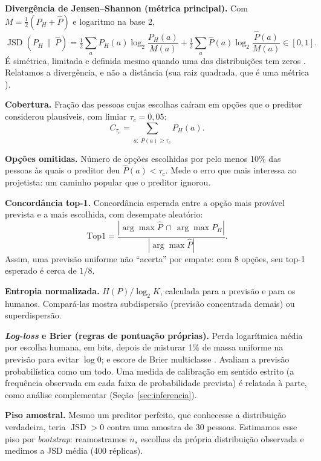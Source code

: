 \documentclass[12pt,oneside,a4paper,chapter=TITLE,english,brazil]{abntex2}
\newcommand{\Ph}{P_H}
\newcommand{\Pp}{\hat{P}}
\DeclareMathOperator{\JSD}{JSD}
\begin{document}
\textbf{Divergência de Jensen--Shannon (métrica principal).} Com $M=\tfrac12(\Ph+\Pp)$ e logaritmo na base 2,
\begin{equation}
\JSD(\Ph \,\|\, \Pp) = \tfrac12 \sum_a \Ph(a)\log_2\frac{\Ph(a)}{M(a)} + \tfrac12 \sum_a \Pp(a)\log_2\frac{\Pp(a)}{M(a)} \in [0,1].
\end{equation}
É simétrica, limitada e definida mesmo quando uma das distribuições tem zeros \cite{lin1991jsd}. Relatamos a divergência, e não a distância (sua raiz quadrada, que é uma métrica \cite{endres2003metric}).

\textbf{Cobertura.} Fração das pessoas cujas escolhas caíram em opções que o preditor considerou plausíveis, com limiar $\tau_c = 0{,}05$:
\begin{equation}
C_{\tau_c} = \sum_{a:\ \Pp(a) \ge \tau_c} \Ph(a).
\end{equation}

\textbf{Opções omitidas.} Número de opções escolhidas por pelo menos 10\% das pessoas às quais o preditor deu $\Pp(a) < \tau_c$. Mede o erro que mais interessa ao projetista: um caminho popular que o preditor ignorou.

\textbf{Concordância top-1.} Concordância esperada entre a opção mais provável prevista e a mais escolhida, com desempate aleatório:
\begin{equation}
\text{Top1} = \frac{|\arg\max \Pp \,\cap\, \arg\max \Ph|}{|\arg\max \Pp|}.
\end{equation}
Assim, uma previsão uniforme não ``acerta'' por empate: com 8 opções, seu top-1 esperado é cerca de $1/8$.

\textbf{Entropia normalizada.} $H(P)/\log_2 K$, calculada para a previsão e para os humanos. Compará-las mostra subdispersão (previsão concentrada demais) ou superdispersão.

\textbf{\textit{Log-loss} e Brier (regras de pontuação próprias).} Perda logarítmica média por escolha humana, em bits, depois de misturar 1\% de massa uniforme na previsão para evitar $\log 0$; e escore de Brier multiclasse \cite{brier1950,gneiting2007proper}. Avaliam a previsão probabilística como um todo. Uma medida de calibração em sentido estrito (a frequência observada em cada faixa de probabilidade prevista) é relatada à parte, como análise complementar (Seção~\ref{sec:inferencia}).

\textbf{Piso amostral.} Mesmo um preditor perfeito, que conhecesse a distribuição verdadeira, teria $\JSD > 0$ contra uma amostra de 30 pessoas. Estimamos esse piso por \textit{bootstrap}: reamostramos $n_s$ escolhas da própria distribuição observada e medimos a JSD média (400 réplicas).
\end{document}
